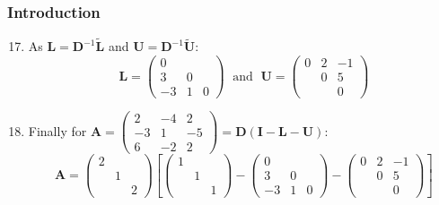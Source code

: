 \documentclass[10pt,compress,handout,ignorenonframetext]{beamer}
\begin{document}
\begin{frame}
  \frametitle{Introduction} 
  \begin{enumerate}
  \setcounter{enumi}{16}
     \item <1-> As $\bm{L}=\bm{D}^{-1}\tilde{\bm{L}}$ and $\bm{U}=\bm{D}^{-1}\tilde{\bm{U}}$:
         \begin{displaymath}
             \bm{L}=\begin{pmatrix}0 & & \\ 3 & 0 & \\ -3 & 1 & 0 \end{pmatrix}\;\text{ and }\; \bm{U}=\begin{pmatrix}0 & 2 & -1 \\ & 0 & 5 \\ & & 0 \end{pmatrix}
         \end{displaymath}           
     \item <2-> Finally for $\bm{A}=\begin{pmatrix} 2 & -4 & 2 \\ -3 & 1 & -5 \\ 6 & -2 & 2\end{pmatrix}=\bm{D}\left(\bm{I} - \bm{L} -\bm{U} \right)$:
         \begin{displaymath}
             \bm{A}=\begin{pmatrix}2 &  & \\ & 1 & \\ & & 2\end{pmatrix}\left[ \begin{pmatrix}1 & &\\ & 1 & \\ & & 1\end{pmatrix} - \begin{pmatrix}0 & & \\ 3 & 0 & \\ -3 & 1 & 0 \end{pmatrix} - \begin{pmatrix}0 & 2 & -1 \\ & 0 & 5 \\ & & 0 \end{pmatrix}\right]
         \end{displaymath}
  \end{enumerate}
\end{frame}
\end{document}
